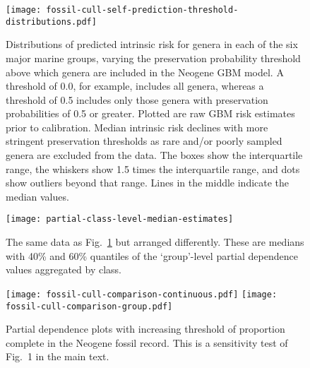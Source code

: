 \documentclass[11pt]{article}
\begin{document}
\begin{figure}[htbp]
\begin{center}
\texttt{[image: fossil-cull-self-prediction-threshold-distributions.pdf]}
\caption{Distributions of predicted intrinsic risk for genera in each of the six major marine groups, varying the preservation probability threshold above which genera are included in the Neogene GBM model. A threshold of 0.0, for example, includes all genera, whereas a threshold of 0.5 includes only those genera with preservation probabilities of 0.5 or greater. Plotted are raw GBM risk estimates prior to calibration. Median intrinsic risk declines with more stringent preservation thresholds as rare and/or poorly sampled genera are excluded from the data. The boxes show the interquartile range, the whiskers show 1.5 times the interquartile range, and dots show outliers beyond that range. Lines in the middle indicate the median values.}
\label{fig:ext-boxplots-paleo-culls}
\end{center}
\end{figure}

\clearpage

\begin{figure}[htbp]
\begin{center}
\texttt{[image: partial-class-level-median-estimates]}
\caption{The same data as Fig.~\ref{fig:ext-boxplots-paleo-culls} but arranged differently. These are medians with 40\% and 60\% quantiles of the `group'-level partial dependence values aggregated by class.}
\label{fig:class-level-partial-order}
\end{center}
\end{figure}

\clearpage

\begin{figure}[htbp]
\begin{center}
\texttt{[image: fossil-cull-comparison-continuous.pdf]}
\texttt{[image: fossil-cull-comparison-group.pdf]}
\caption{Partial dependence plots with increasing threshold of proportion complete in the Neogene fossil record. This is a sensitivity test of Fig.~1 in the main text.}
\label{fig:partial-paleo-culls}
\end{center}
\end{figure}

\clearpage

%
\clearpage
\end{document}
